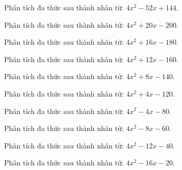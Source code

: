 \begin{bt}
	Phân tích đa thức sau thành nhân tử: $4 x^2 - 52 x + 144$.
\end{bt}
\begin{bt}
	Phân tích đa thức sau thành nhân tử: $4 x^2 + 20 x - 200$.
\end{bt}
\begin{bt}
	Phân tích đa thức sau thành nhân tử: $4 x^2 + 16 x - 180$.
\end{bt}
\begin{bt}
	Phân tích đa thức sau thành nhân tử: $4 x^2 + 12 x - 160$.
\end{bt}
\begin{bt}
	Phân tích đa thức sau thành nhân tử: $4 x^2 + 8 x - 140$.
\end{bt}
\begin{bt}
	Phân tích đa thức sau thành nhân tử: $4 x^2 + 4 x - 120$.
\end{bt}
\begin{bt}
	Phân tích đa thức sau thành nhân tử: $4 x^2 - 4 x - 80$.
\end{bt}
\begin{bt}
	Phân tích đa thức sau thành nhân tử: $4 x^2 - 8 x - 60$.
\end{bt}
\begin{bt}
	Phân tích đa thức sau thành nhân tử: $4 x^2 - 12 x - 40$.
\end{bt}
\begin{bt}
	Phân tích đa thức sau thành nhân tử: $4 x^2 - 16 x - 20$.
\end{bt}
